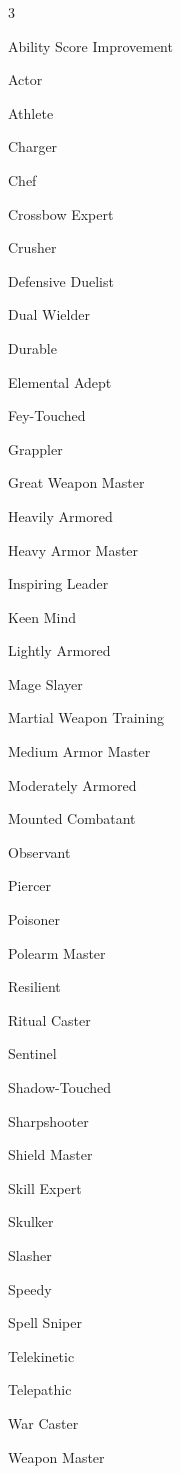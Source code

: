 \documentclass[10pt,a4paper,twoside,bg=print,twocolumn,openany,nodeprecatedcode]{dndbook}
\begin{document}
\begin{description}
\begin{multicols}{3}
\item Ability Score Improvement
\item Actor
\item Athlete
\item Charger
\item Chef
\item Crossbow Expert
\item Crusher
\item Defensive Duelist
\item Dual Wielder
\item Durable
\item Elemental Adept
\item Fey-Touched
\item Grappler
\item Great Weapon Master
\item Heavily Armored
\item Heavy Armor Master
\item Inspiring Leader
\item Keen Mind
\item Lightly Armored
\item Mage Slayer
\item Martial Weapon Training
\item Medium Armor Master
\item Moderately Armored
\item Mounted Combatant
\item Observant
\item Piercer
\item Poisoner
\item Polearm Master
\item Resilient
\item Ritual Caster
\item Sentinel
\item Shadow-Touched
\item Sharpshooter
\item Shield Master
\item Skill Expert
\item Skulker
\item Slasher
\item Speedy
\item Spell Sniper
\item Telekinetic
\item Telepathic
\item War Caster
\item Weapon Master
\end{multicols}

\end{description}
\end{document}
